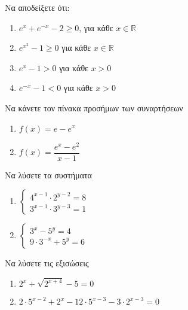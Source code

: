 \documentclass[greek]{beamer}
\begin{document}
\begin{askisi}

  Να αποδείξετε ότι:
  \begin{enumerate}
    \item<1-> $e^x+e^{-x}-2\ge 0$, για κάθε $x\in \mathbb{R}$
    \item<2-> $e^{x^2}-1\ge 0$ για κάθε $x\in\mathbb{R}$
    \item<3-> $e^x-1>0$ για κάθε $x>0$
    \item<4-> $e^{-x}-1<0$ για κάθε $x>0$
  \end{enumerate}


\end{askisi}

\begin{askisi}
  Να κάνετε τον πίνακα προσήμων των συναρτήσεων
  \begin{enumerate}
    \item<1-> $f(x)=e-e^x$
    \item<2-> $f(x)=\dfrac{e^x-e^2}{x-1}$
  \end{enumerate}


\end{askisi}

\begin{askisi}
  Να λύσετε τα συστήματα
  \begin{enumerate}
    \item<1-> $\begin{cases}
              4^{x-1}\cdot 2^{y-2}=8 \\
              3^{x-1}\cdot 3^{y-3}=1
            \end{cases}$
    \item<2-> $\begin{cases}
              3^{x}- 5^{y}=4 \\
              9\cdot 3^{-x}+ 5^{y}=6
            \end{cases}$
  \end{enumerate}


\end{askisi}

\begin{askisi}
  Να λύσετε τις εξισώσεις
  \begin{enumerate}
    \item<1-> $2^x+\sqrt{2^{x+4}}-5=0$
    \item<2-> $2\cdot 5^{x-2}+2^x-12\cdot 5^{x-3}-3\cdot 2^{x-3}=0$
  \end{enumerate}


\end{askisi}
\end{document}
